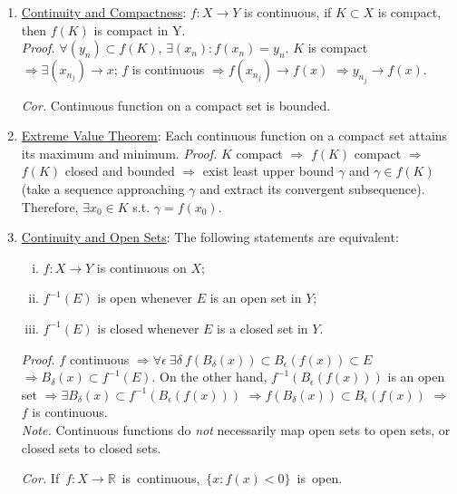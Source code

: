 \documentclass[%
 aip,
 jmp,%
 amsmath,amssymb,
 reprint,%
]{revtex4-1}
\def\R{{\mathbb R}}
\def\d{\delta}
\def\e{\epsilon}
\renewenvironment{proof}{\color{gray}\footnotesize\emph{Proof.}}{}
\newcommand{\imply}{\Rightarrow}
\newcommand{\defn}[1]{\underline{#1}}
\begin{document}
\begin{enumerate}
  \item \defn{Continuity and Compactness}:  $f: X \to Y$ is continuous,
  if $K \subset X$ is compact, then $f(K)$ is compact in Y.\\
      \begin{proof}
        $\forall (y_n) \subset f(K)$, $\exists (x_n): f(x_n)=y_n$.
        $K$ is compact $\imply \exists (x_{n_j}) \to x$;
        $f$ is continuous $\imply f(x_{n_j}) \to f(x)$ $\imply y_{n_j} \to f(x)$.
      \end{proof}

      \emph{Cor.} Continuous function on a compact set is bounded.


  \item \defn{Extreme Value Theorem}: Each continuous function on a compact
  set attains its maximum and minimum.
      \begin{proof}
        $K$ compact $\imply$ $f(K)$ compact $\imply$ $f(K)$ closed and bounded
        $\imply$ exist least upper bound $\gamma$ and $\gamma \in f(K)$
        (take a sequence approaching $\gamma$ and extract its convergent
        subsequence). Therefore, $\exists x_0 \in K$ s.t. $\gamma=f(x_0)$.
      \end{proof}

  \item \defn{Continuity and Open Sets}: The following statements are equivalent:
      \begin{enumerate}[(i)]
        \item $f: X \to Y$ is continuous on $X$;
        \item $f^{-1}(E)$ is open whenever $E$ is an open set in $Y$;
        \item $f^{-1}(E)$ is closed whenever $E$ is a closed set in $Y$.
      \end{enumerate}
      \begin{proof}
        $f$ continuous $\imply \forall\e\ \exists\d\ f(B_{\d}(x)) \subset B_{\e}(f(x)) \subset E$
        $\imply B_{\d}(x) \subset f^{-1}(E)$.
        On the other hand, $f^{-1}(B_{\e}(f(x)))$ is an open set
        $\imply \exists B_{\d}(x) \subset f^{-1}(B_{\e}(f(x)))$
        $\imply f(B_{\d}(x)) \subset B_{\e}(f(x))$ $\imply$ $f$ is continuous.
      \end{proof} \\

      \emph{Note.} Continuous functions do \emph{not} necessarily
      map open sets to open sets, or closed sets to closed sets.

      \emph{Cor.} \mbox{If $f: X\to\R$ is continuous, $\{x: f(x)<0\}$ is open.}

\end{enumerate}
\end{document}
